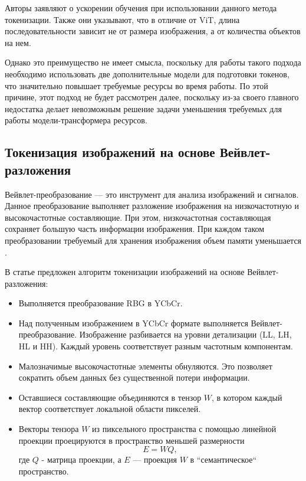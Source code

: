 Авторы заявляют о ускорении обучения при использовании данного метода токенизации. Также они указывают, что в отличие от ViT, длина последовательности зависит не от размера изображения, а от количества объектов на нем. 

Однако это преимущество не имеет смысла, поскольку для работы такого подхода необходимо использовать две дополнительные модели для подготовки токенов, что значительно повышает требуемые ресурсы во время работы. По этой причине, этот подход не будет рассмотрен далее, поскольку из-за своего главного недостатка делает невозможным решение задачи уменьшения требуемых для работы модели-трансформера ресурсов.

\subsection{Токенизация изображений на основе Вейвлет-разложения}

Вейвлет-преобразование --- это инструмент для анализа изображений и сигналов. Данное преобразование выполняет разложение изображения на низкочастотную и высокочастотные составляющие. При этом, низкочастотная составляющая сохраняет большую часть информации изображения. При каждом таком преобразовании требуемый для хранения изображения объем памяти уменьшается \cite{mallat_wavelet}.

В статье \cite{wavelet_tokenization} предложен алгоритм токенизации изображений на основе Вейвлет-разложения:

\begin{itemize}
    \item Выполняется преобразование RBG в YCbCr.
    \item Над полученным изображением в YCbCr формате выполняется Вейвлет-преобразование. Изображение разбивается на уровни детализации (LL, LH, HL и HH). Каждый уровень соответствует разным частотным компонентам.
    \item Малозначимые высокочастотные элементы обнуляются. Это позволяет сократить объем данных без существенной потери информации.
    \item Оставшиеся составляющие объединяются в тензор $W$, в котором каждый вектор соответствует локальной области пикселей.
    \item Векторы тензора $W$ из пиксельного пространства с помощью линейной проекции проецируются в пространство меньшей размерности 
    $$
    E = W Q,
    $$
    где $Q$ - матрица проекции, а $E$ --- проекция $W$ в ``семантическое`` пространство.
\end{itemize}

